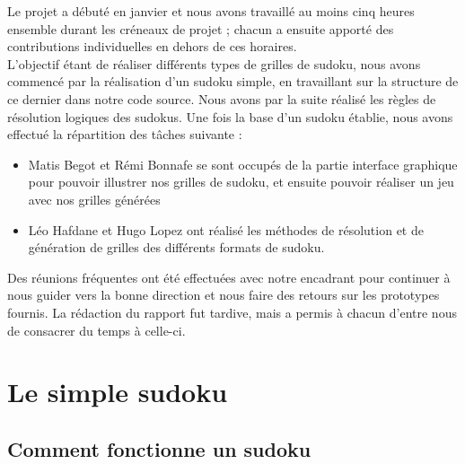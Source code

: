 \documentclass[a4paper]{article}
\begin{document}
\begin{justify} 
    \qquad Le projet a débuté en janvier et nous avons travaillé au moins cinq heures ensemble durant les créneaux de projet ; chacun a ensuite apporté des contributions individuelles en dehors de ces horaires.\\
    
    L'objectif étant de réaliser différents types de grilles de sudoku, nous avons commencé par la réalisation d'un sudoku simple, en travaillant sur la structure de ce dernier dans notre code source. Nous avons par la suite réalisé les règles de résolution logiques des sudokus. Une fois la base d'un sudoku établie, nous avons effectué la répartition des tâches suivante :
    \begin{itemize}
        \item Matis Begot et Rémi Bonnafe se sont occupés de la partie interface graphique pour pouvoir illustrer nos grilles de sudoku, et ensuite pouvoir réaliser un jeu avec nos grilles générées 
        \vspace{0.07cm}   
        \item Léo Hafdane et Hugo Lopez ont réalisé les méthodes de résolution et de génération de grilles des différents formats de sudoku.
    \end{itemize} 
    
    \noindent Des réunions fréquentes ont été effectuées avec notre encadrant pour continuer à nous guider vers la bonne direction et nous faire des retours sur les prototypes fournis. La rédaction du rapport fut tardive, mais a permis à chacun d'entre nous de consacrer du temps à celle-ci.
\end{justify}


\newpage
\section{Le simple sudoku}

\subsection{Comment fonctionne un sudoku}
\end{document}
